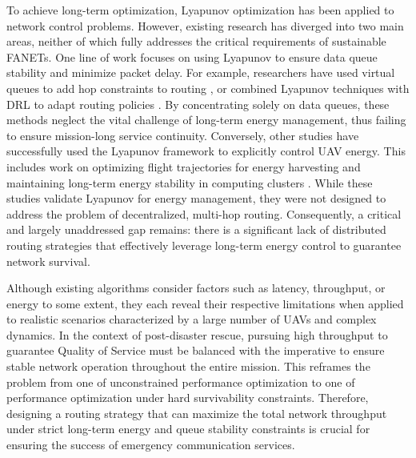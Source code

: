\documentclass[runningheads]{llncs}
\begin{document}
To achieve long-term optimization, Lyapunov optimization has been applied to network control problems. However, existing research has diverged into two main areas, neither of which fully addresses the critical requirements of sustainable FANETs. One line of work focuses on using Lyapunov to ensure data queue stability and minimize packet delay. For example, researchers have used virtual queues to add hop constraints to routing \cite{related2}, or combined Lyapunov techniques with DRL to adapt routing policies \cite{intro9}. By concentrating solely on data queues, these methods neglect the vital challenge of long-term energy management, thus failing to ensure mission-long service continuity. Conversely, other studies have successfully used the Lyapunov framework to explicitly control UAV energy. This includes work on optimizing flight trajectories for energy harvesting \cite{intro1} and maintaining long-term energy stability in computing clusters \cite{intro2}. While these studies validate Lyapunov for energy management, they were not designed to address the problem of decentralized, multi-hop routing. Consequently, a critical and largely unaddressed gap remains: there is a significant lack of distributed routing strategies that effectively leverage long-term energy control to guarantee network survival.

Although existing algorithms consider factors such as latency, throughput, or energy to some extent, they each reveal their respective limitations when applied to realistic scenarios characterized by a large number of UAVs and complex dynamics. In the context of post-disaster rescue, pursuing high throughput to guarantee Quality of Service must be balanced with the imperative to ensure stable network operation throughout the entire mission. This reframes the problem from one of unconstrained performance optimization to one of performance optimization under hard survivability constraints. Therefore, designing a routing strategy that can maximize the total network throughput under strict long-term energy and queue stability constraints is crucial for ensuring the success of emergency communication services.
\end{document}
